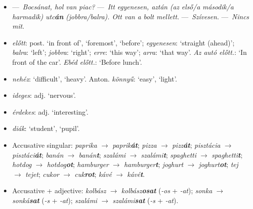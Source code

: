 \documentclass[a4paper,11pt]{article}
\begin{document}
\begin{itemize}
  \item ---~\emph{Bocsánat, hol van piac?} ---~\emph{Itt egyenesen,
  aztán (az első/a második/a harmadik) utc\textbf{án}
  (jobbra/balra). Ott van a bolt mellett.} ---~\emph{Szívesen.}
    ---~\emph{Nincs mit}.

  \item \emph{előtt}: post. `in front of', `foremost', `before';
    \emph{egyenesen}: `straight (ahead)'; \emph{balra}: `left';
    \emph{jobbra}: `right'; \emph{erre}: `this way'; \emph{arra}:
    `that way'. \emph{Az autó előtt.}: `In front of the
    car'. \emph{Ebéd előtt.}: `Before lunch'.

  \item \emph{nehéz}: `difficult', `heavy'. Anton. \emph{könnyű}:
    `easy', `light'.

  \item \emph{ideges}: adj. `nervous'.

  \item \emph{érdekes}: adj. `interesting'.

  \item \emph{diák}: `student', `pupil'.

  \item Accusative singular: \emph{paprika} $\rightarrow$
    \emph{paprik\textbf{át}}; \emph{pizza} $\rightarrow$
    \emph{pizz\textbf{át}}; \emph{pisztácia} $\rightarrow$
    \emph{pisztáci\textbf{át}}; \emph{banán} $\rightarrow$
    \emph{banán\textbf{t}}; \emph{szalámi} $\rightarrow$
    \emph{szalámi\textbf{t}}; \emph{spaghetti} $\rightarrow$
    \emph{spaghetti\textbf{t}}; \emph{hotdog} $\rightarrow$
    \emph{hotdog\textbf{ot}}; \emph{hamburger} $\rightarrow$
    \emph{hamburger\textbf{t}}; \emph{joghurt} $\rightarrow$
    \emph{joghurt\textbf{ot}}; \emph{tej} $\rightarrow$ \emph{tejet};
    \emph{cukor} $\rightarrow$ \emph{cuk\textbf{rot}}; \emph{kávé}
    $\rightarrow$ \emph{kávé\textbf{t}}.

  \item Accusative + adjective: \emph{kolbász} $\rightarrow$
    \emph{kolbász\textbf{osat}} (\emph{-os} + \emph{-at});
    \emph{sonka} $\rightarrow$ \emph{sonká\textbf{sat}} (\emph{-s} +
    \emph{-at}); \emph{szalámi} $\rightarrow$
    \emph{szalámi\textbf{sat}} (\emph{-s} + \emph{-at}).


\end{itemize}
\end{document}

